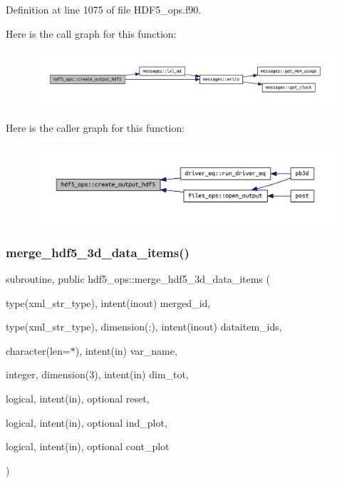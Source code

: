 Definition at line 1075 of file H\+D\+F5\+\_\+ops.\+f90.

Here is the call graph for this function\+:\nopagebreak
\begin{figure}[H]
\begin{center}
\leavevmode
\includegraphics[width=350pt]{namespacehdf5__ops_a1263636fffc4f4aa86f72bd5fd3352a0_cgraph}
\end{center}
\end{figure}
Here is the caller graph for this function\+:\nopagebreak
\begin{figure}[H]
\begin{center}
\leavevmode
\includegraphics[width=350pt]{namespacehdf5__ops_a1263636fffc4f4aa86f72bd5fd3352a0_icgraph}
\end{center}
\end{figure}
\mbox{\label{namespacehdf5__ops_a7b18b66402089eef2288b2d532f6af5d}} 
\subsubsection{\texorpdfstring{merge\+\_\+hdf5\+\_\+3d\+\_\+data\+\_\+items()}{merge\_hdf5\_3d\_data\_items()}}
{\footnotesize\ttfamily subroutine, public hdf5\+\_\+ops\+::merge\+\_\+hdf5\+\_\+3d\+\_\+data\+\_\+items (\begin{DoxyParamCaption}\item[{type(xml\+\_\+str\+\_\+type), intent(inout)}]{merged\+\_\+id,  }\item[{type(xml\+\_\+str\+\_\+type), dimension(\+:), intent(inout)}]{dataitem\+\_\+ids,  }\item[{character(len=$\ast$), intent(in)}]{var\+\_\+name,  }\item[{integer, dimension(3), intent(in)}]{dim\+\_\+tot,  }\item[{logical, intent(in), optional}]{reset,  }\item[{logical, intent(in), optional}]{ind\+\_\+plot,  }\item[{logical, intent(in), optional}]{cont\+\_\+plot }\end{DoxyParamCaption})}



